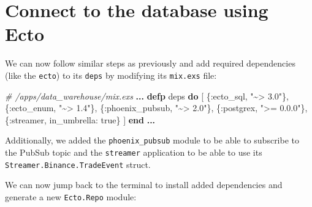 \documentclass[
]{book}
\newenvironment{Shaded}{\begin{snugshade}}{\end{snugshade}}
\newcommand{\AttributeTok}[1]{\textcolor[rgb]{0.77,0.63,0.00}{#1}}
\newcommand{\CommentTok}[1]{\textcolor[rgb]{0.56,0.35,0.01}{\textit{#1}}}
\newcommand{\ConstantTok}[1]{\textcolor[rgb]{0.00,0.00,0.00}{#1}}
\newcommand{\ExtensionTok}[1]{#1}
\newcommand{\KeywordTok}[1]{\textcolor[rgb]{0.13,0.29,0.53}{\textbf{#1}}}
\newcommand{\NormalTok}[1]{#1}
\newcommand{\OperatorTok}[1]{\textcolor[rgb]{0.81,0.36,0.00}{\textbf{#1}}}
\newcommand{\StringTok}[1]{\textcolor[rgb]{0.31,0.60,0.02}{#1}}
\newcommand{\VariableTok}[1]{\textcolor[rgb]{0.00,0.00,0.00}{#1}}
\begin{document}
\hypertarget{connect-to-the-database-using-ecto}{%
\section{Connect to the database using Ecto}\label{connect-to-the-database-using-ecto}}

We can now follow similar steps as previously and add required dependencies (like the \texttt{ecto}) to its \texttt{deps} by modifying its \texttt{mix.exs} file:

\begin{Shaded}
\begin{Highlighting}[]
  \CommentTok{\# /apps/data\_warehouse/mix.exs}
  \OperatorTok{...}
  \KeywordTok{defp}\NormalTok{ deps }\KeywordTok{do}
\NormalTok{    [}
\NormalTok{      \{}\VariableTok{:ecto\_sql}\NormalTok{, }\StringTok{"\textasciitilde{}\textgreater{} 3.0"}\NormalTok{\},}
\NormalTok{      \{}\VariableTok{:ecto\_enum}\NormalTok{, }\StringTok{"\textasciitilde{}\textgreater{} 1.4"}\NormalTok{\},}
\NormalTok{      \{}\VariableTok{:phoenix\_pubsub}\NormalTok{, }\StringTok{"\textasciitilde{}\textgreater{} 2.0"}\NormalTok{\},}
\NormalTok{      \{}\VariableTok{:postgrex}\NormalTok{, }\StringTok{"\textgreater{}= 0.0.0"}\NormalTok{\},}
\NormalTok{      \{}\VariableTok{:streamer}\NormalTok{, }\VariableTok{in\_umbrella:} \ConstantTok{true}\NormalTok{\}}
\NormalTok{    ]}
  \KeywordTok{end}
  \OperatorTok{...}
\end{Highlighting}
\end{Shaded}

Additionally, we added the \texttt{phoenix\_pubsub} module to be able to subscribe to the PubSub topic and the \texttt{streamer} application to be able to use its \texttt{Streamer.Binance.TradeEvent} struct.

We can now jump back to the terminal to install added dependencies and generate a new \texttt{Ecto.Repo} module:

\begin{Shaded}
\end{Shaded}
\end{document}
